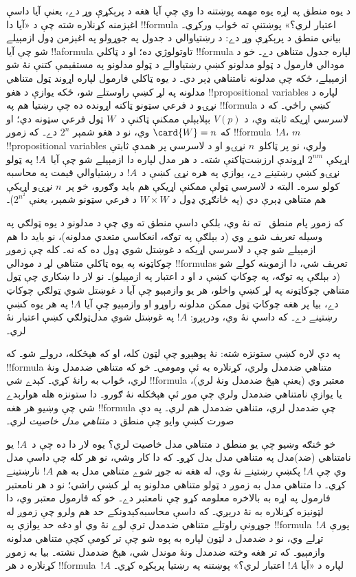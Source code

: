 \documentclass[../../../include/open-logic-section]{subfiles}
\begin{document}


د يوه منطق په اړه يوه مهمه پوښتنه دا وي چې آيا هغه د پرېکړې وړ دے، يعنې آيا
داسې اغېزمنه کړنلاره شته چې د «آيا دا !!{formula} اعتبار لري؟» پوښتنې ته ځواب
ورکړي۔ بياني منطق د پرېکړې وړ دے: د رښتياوالي د جدول په جوړولو په اغېزمن ډول
ازمېيلے شو چې آيا !!a{formula} تاوتولوژي ده؛ او د ټاکلي !!{formula} لپاره
جدول متناهي دے۔ خو د مودالي فارمول د ټولو مدلونو کښې رښتياوالے د ټولو مدلونو په مستقيمې کتنې نۀ شو ازمېيلے،
ځکه چې مدلونه نامتناهي ډېر دي۔ د يوه ټاکلي فارمول لپاره
اړوند ټول متناهي مدلونه په لړ کښې راوستلے شو، ځکه يوازې د هغو
!!{propositional variable}s لپاره د نړۍو د فرعي سټونو ټاکنه اړونده ده چې
رښتيا هم په !!{formula} کښې راځي۔ که د لاسرسي اړيکه ثابته وي، د $V(p)$
بېلابېلې ممکنې ټاکنې د~$W$ ټول فرعي سټونه دي؛ او که $\card{W} = n$ وي،
نو د هغو شمېر $2^n$ دے۔ که زموږ !!{formula}~$!A$، $m$ !!{propositional
  variable}s ولري، نو پر ټاکلو~$n$ نړۍو او د لاسرسي پر همدې ثابتې اړيکې
$2^{nm}$ اړوندې ارزښت‌ټاکنې شته۔ د هر
مدل لپاره دا ازمېيلے شو چې آيا~$!A$ په ټولو نړۍو کښې رښتينے دے، يوازې په هره
نړۍ کښې د~$!A$ د رښتياوالي قيمت په محاسبه کولو سره۔ البته د لاسرسي ټولې ممکنې
اړيکې هم بايد وګورو، خو پر~$n$ نړۍو اړيکې هم متناهي ډېرې دي (په ځانګړي ډول
د $W \times W$ د فرعي سټونو شمېر، يعنې $2^{n^2}$)۔

که زموږ پام منطق~ ته نۀ وي، بلکې داسې منطق ته وي چې د مدلونو د يوه
ټولګي په وسيله تعريف شوے وي (د بېلګې په توګه، انعکاسي متعدي مدلونه)، نو بايد
دا هم ازمېيلے شو چې د لاسرسي اړيکه د غوښتل شوي ډول ده که نه۔ کله چې زموږ
چوکاټونه په يوه ټاکلي متناهي لړ د مودالي !!{formula}s تعريف شي، دا
ازموينه کولے شو
(د بېلګې په توګه، په چوکاټ کښې د  او  د اعتبار په ازمېيلو)۔ نو
لار دا ښکاري چې ټول متناهي چوکاټونه په لړ کښې واخلو، هر يو وازمېيو چې آيا
د غوښتل شوي ټولګي چوکاټ دے، بيا پر هغه چوکاټ ټول ممکن مدلونه راوړو او
وازمېيو چې آيا $!A$ په هر يوه کښې رښتينے دے۔ که داسې نۀ وي، ودرېږو: $!A$
په غوښتل شوي مدل‌ټولګي کښې اعتبار نۀ لري۔

په دې لاره کښې ستونزه شته: نۀ پوهېږو چې لټون کله، او که هېڅکله، درولے شو۔
که !!{formula} متناهي ضدمدل ولري، کړنلاره به ئې ومومي۔ خو که متناهي ضدمدل
ونۀ لري، ځواب به رانۀ کړي۔ کېدے شي !!{formula} معتبر وي (يعنې هېڅ ضدمدل
ونۀ لري)، يا يوازې نامتناهي ضدمدل ولري چې موږ ئې هېڅکله نۀ ګورو۔ دا ستونزه
هله هوارېدے شي چې وښيو هر هغه !!{formula} چې ضدمدل لري، متناهي ضدمدل هم
لري۔ په دې صورت کښې وايو چې منطق د \emph{متناهي مدل خاصيت} لري۔

خو څنګه وښيو چې يو منطق د متناهي مدل خاصيت لري؟ يوه لار دا ده چې د~$!A$
يو نامتناهي (ضد)مدل په متناهي مدل بدل کړو۔ که دا کار وشي، نو هر کله چې داسې
مدل وي چې $!A$ پکښې رښتينے نۀ وي، له هغه نه جوړ شوے متناهي مدل به هم $!A$
نارښتينے کړي۔ دا متناهي مدل به زموږ د ټولو متناهي مدلونو په لړ کښې راشي؛ نو
د هر نامعتبر فارمول په اړه به بالاخره معلومه کړو چې نامعتبر دے۔ خو که
فارمول معتبر وي، دا لټونيزه کړنلاره به نۀ درېږي۔ که داسې محاسبه‌کېدونکے
حد هم ولرو چې زموږ له جوړونې راوتلے متناهي ضدمدل ترې لوے نۀ وي او دغه حد
يوازې په !!{formula}~$!A$ پورې تړلے وي، نو د ضدمدل د لټون لپاره به پوه شو
چې تر کومې کچې متناهي مدلونه وازمېيو۔ که تر هغه وخته ضدمدل ونۀ موندل شي،
هېڅ ضدمدل نشته۔ بيا به زموږ کړنلاره د هر !!{formula}~$!A$ لپاره د «آيا
$!A$ اعتبار لري؟» پوښتنه په رښتيا پرېکړه کړي۔
\end{document}
